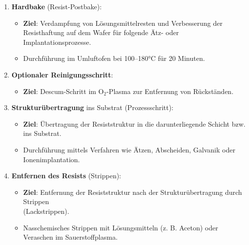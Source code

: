 \documentclass{article} %
\begin{document}
\begin{enumerate}
    \item \textbf{Hardbake} (Resist-Postbake):
    \begin{itemize}
        \item \textbf{Ziel}: Verdampfung von Lösungsmittelresten und Verbesserung der Resisthaftung auf dem Wafer für folgende Ätz- oder Implantationsprozesse.
        \item Durchführung im Umluftofen bei 100–180°C für 20 Minuten.
    \end{itemize}

    \item \textbf{Optionaler Reinigungsschritt}:
    \begin{itemize}
        \item \textbf{Ziel}: Descum-Schritt im $\mathrm{O}_2$-Plasma zur Entfernung von Rückständen.
    \end{itemize}

    \item \textbf{Strukturübertragung} ins Substrat (Prozessschritt):
    \begin{itemize}
        \item \textbf{Ziel}: Übertragung der Resiststruktur in die darunterliegende Schicht bzw. ins Substrat.
        \item Durchführung mittels Verfahren wie Ätzen, Abscheiden, Galvanik oder Ionenimplantation.
    \end{itemize}

    \item \textbf{Entfernen des Resists} (Strippen):
    \begin{itemize}
        \item \textbf{Ziel}: Entfernung der Resiststruktur nach der Strukturübertragung durch Strippen \\ (Lackstrippen).
        \item Nasschemisches Strippen mit Lösungsmitteln (z. B. Aceton) oder Veraschen im Sauerstoffplasma.
    \end{itemize}
\end{enumerate}




\thispagestyle{empty}
\newpage
\end{document}
